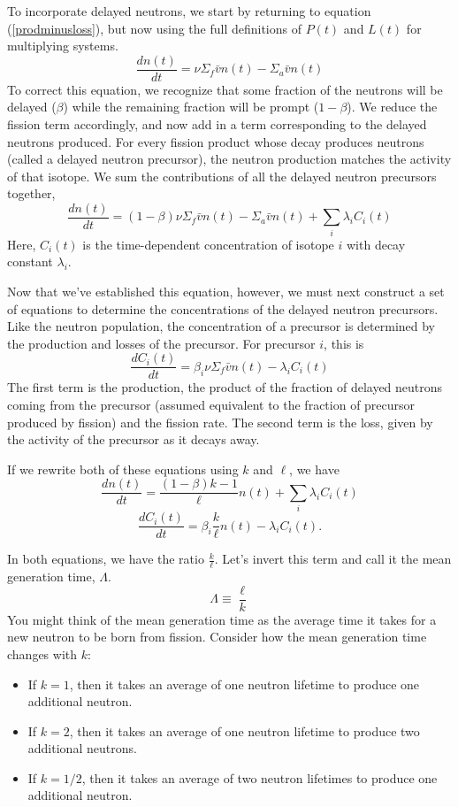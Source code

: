 \documentclass{report}
\begin{document}
To incorporate delayed neutrons, we start by returning to equation (\ref{prodminusloss}), but now using the full definitions of $P(t)$ and $L(t)$ for multiplying systems.
$$ \frac{dn(t)}{dt} = \nu\Sigma_f\bar{v}n(t) - \Sigma_a\bar{v}n(t) $$
To correct this equation, we recognize that some fraction of the neutrons will be delayed ($\beta$) while the remaining fraction will be prompt ($1-\beta$). We reduce the fission term accordingly, and now add in a term corresponding to the delayed neutrons produced. For every fission product whose decay produces neutrons (called a delayed neutron precursor), the neutron production matches the activity of that isotope. We sum the contributions of all the delayed neutron precursors together,
$$ \frac{dn(t)}{dt} = (1-\beta)\nu\Sigma_f\bar{v}n(t) - \Sigma_a\bar{v}n(t) + \sum_i \lambda_i C_i(t)$$
Here, $C_i(t)$ is the time-dependent concentration of isotope $i$ with decay constant $\lambda_i$.

Now that we've established this equation, however, we must next construct a set of equations to determine the concentrations of the delayed neutron precursors. Like the neutron population, the concentration of a precursor is determined by the production and losses of the precursor. For precursor $i$, this is
$$ \frac{dC_i(t)}{dt} = \beta_i \nu \Sigma_f \bar{v} n(t) - \lambda_i C_i(t) $$
The first term is the production, the product of the fraction of delayed neutrons coming from the precursor (assumed equivalent to the fraction of precursor produced by fission) and the fission rate. The second term is the loss, given by the activity of the precursor as it decays away. 

If we rewrite both of these equations using $k$ and $\ell$, we have 
$$ \frac{dn(t)}{dt} = \frac{(1-\beta)k - 1}{\ell}n(t) + \sum_i \lambda_i C_i(t) $$
$$ \frac{dC_i(t)}{dt} = \beta_i \frac{k}{\ell} n(t) - \lambda_i C_i(t) .$$

In both equations, we have the ratio $\frac{k}{\ell}$. Let's invert this term and call it the mean generation time, $\Lambda$. 
$$ \Lambda \equiv \frac{\ell}{k} $$
You might think of the mean generation time as the average time it takes for a new neutron to be born from fission. Consider how the mean generation time changes with $k$:
\begin{itemize}
\item If $k=1$, then it takes an average of one neutron lifetime to produce one additional neutron.
\item If $k=2$, then it takes an average of one neutron lifetime to produce two additional neutrons.
\item If $k=1/2$, then it takes an average of two neutron lifetimes to produce one additional neutron.
\end{itemize}
\end{document}
